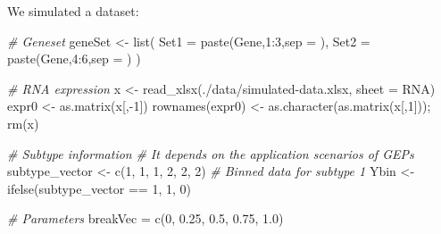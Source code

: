 \documentclass[
  12pt,
]{book}
\newenvironment{Shaded}{\begin{snugshade}}{\end{snugshade}}
\newcommand{\AttributeTok}[1]{\textcolor[rgb]{0.77,0.63,0.00}{#1}}
\newcommand{\CommentTok}[1]{\textcolor[rgb]{0.56,0.35,0.01}{\textit{#1}}}
\newcommand{\DecValTok}[1]{\textcolor[rgb]{0.00,0.00,0.81}{#1}}
\newcommand{\FloatTok}[1]{\textcolor[rgb]{0.00,0.00,0.81}{#1}}
\newcommand{\FunctionTok}[1]{\textcolor[rgb]{0.00,0.00,0.00}{#1}}
\newcommand{\NormalTok}[1]{#1}
\newcommand{\OtherTok}[1]{\textcolor[rgb]{0.56,0.35,0.01}{#1}}
\newcommand{\SpecialCharTok}[1]{\textcolor[rgb]{0.00,0.00,0.00}{#1}}
\newcommand{\StringTok}[1]{\textcolor[rgb]{0.31,0.60,0.02}{#1}}
\begin{document}
We simulated a dataset:

\begin{Shaded}
\begin{Highlighting}[]
\CommentTok{\# Geneset}
\NormalTok{geneSet }\OtherTok{\textless{}{-}} \FunctionTok{list}\NormalTok{(}
  \AttributeTok{Set1 =} \FunctionTok{paste}\NormalTok{(}\StringTok{\textquotesingle{}Gene\textquotesingle{}}\NormalTok{,}\DecValTok{1}\SpecialCharTok{:}\DecValTok{3}\NormalTok{,}\AttributeTok{sep =} \StringTok{\textquotesingle{}\textquotesingle{}}\NormalTok{),}
  \AttributeTok{Set2 =} \FunctionTok{paste}\NormalTok{(}\StringTok{\textquotesingle{}Gene\textquotesingle{}}\NormalTok{,}\DecValTok{4}\SpecialCharTok{:}\DecValTok{6}\NormalTok{,}\AttributeTok{sep =} \StringTok{\textquotesingle{}\textquotesingle{}}\NormalTok{)}
\NormalTok{)}

\CommentTok{\# RNA expression}
\NormalTok{x }\OtherTok{\textless{}{-}} \FunctionTok{read\_xlsx}\NormalTok{(}\StringTok{\textquotesingle{}./data/simulated{-}data.xlsx\textquotesingle{}}\NormalTok{, }\AttributeTok{sheet =} \StringTok{\textquotesingle{}RNA\textquotesingle{}}\NormalTok{)}
\NormalTok{expr0 }\OtherTok{\textless{}{-}} \FunctionTok{as.matrix}\NormalTok{(x[,}\SpecialCharTok{{-}}\DecValTok{1}\NormalTok{])}
\FunctionTok{rownames}\NormalTok{(expr0) }\OtherTok{\textless{}{-}} \FunctionTok{as.character}\NormalTok{(}\FunctionTok{as.matrix}\NormalTok{(x[,}\DecValTok{1}\NormalTok{])); }\FunctionTok{rm}\NormalTok{(x)}

\CommentTok{\# Subtype information}
\CommentTok{\# It depends on the application scenarios of GEPs}
\NormalTok{subtype\_vector }\OtherTok{\textless{}{-}} \FunctionTok{c}\NormalTok{(}\DecValTok{1}\NormalTok{, }\DecValTok{1}\NormalTok{, }\DecValTok{1}\NormalTok{, }\DecValTok{2}\NormalTok{, }\DecValTok{2}\NormalTok{, }\DecValTok{2}\NormalTok{)}
\CommentTok{\# Binned data for subtype 1}
\NormalTok{Ybin }\OtherTok{\textless{}{-}} \FunctionTok{ifelse}\NormalTok{(subtype\_vector }\SpecialCharTok{==} \DecValTok{1}\NormalTok{, }\DecValTok{1}\NormalTok{, }\DecValTok{0}\NormalTok{)}

\CommentTok{\# Parameters}
\NormalTok{breakVec }\OtherTok{=} \FunctionTok{c}\NormalTok{(}\DecValTok{0}\NormalTok{, }\FloatTok{0.25}\NormalTok{, }\FloatTok{0.5}\NormalTok{, }\FloatTok{0.75}\NormalTok{, }\FloatTok{1.0}\NormalTok{)}


\end{Highlighting}
\end{Shaded}
\end{document}
